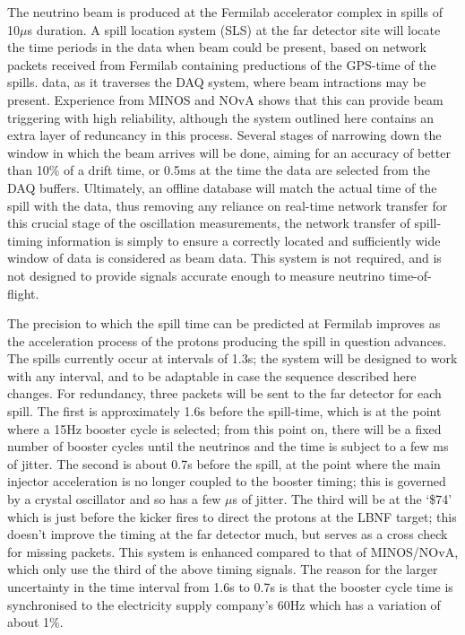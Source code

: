 The neutrino beam is produced at the Fermilab accelerator complex in
spills of 10$\mu$s duration.  A spill location system (SLS) at the far
detector site will locate the time periods in the data when beam could
be present, based on network packets received from Fermilab containing
preductions of the GPS-time of the spills. data, as it traverses the
DAQ system, where beam intractions may be present.  Experience from
MINOS and NOvA shows that this can provide beam triggering with high
reliability, although the system outlined here contains an extra layer
of reduncancy in this process.  Several stages of narrowing down the
window in which the beam arrives will be done, aiming for an accuracy
of better than 10\% of a drift time, or 0.5\/ms at the time the data
are selected from the DAQ buffers.  Ultimately, an offline database
will match the actual time of the spill with the data, thus removing
any reliance on real-time network transfer for this crucial stage of
the oscillation measurements, the network transfer of spill-timing
information is simply to ensure a correctly located and sufficiently
wide window of data is considered as beam data. This system is not
required, and is not designed to provide signals accurate enough to
measure neutrino time-of-flight.

The precision to which the spill time can be predicted at Fermilab
improves as the acceleration process of the protons producing the
spill in question advances.  The spills currently occur at intervals
of 1.3\/s; the system will be designed to work with any interval, and
to be adaptable in case the sequence described here changes.  For
redundancy, three packets will be sent to the far detector for each
spill.  The first is approximately 1.6\/s before the spill-time, which
is at the point where a 15\/Hz booster cycle is selected; from this
point on, there will be a fixed number of booster cycles until the
neutrinos and the time is subject to a few ms of jitter.  The second
is about 0.7\/s before the spill, at the point where the main injector
acceleration is no longer coupled to the booster timing; this is
governed by a crystal oscillator and so has a few $\mu$s of jitter.
The third will be at the `\$74' which is just before the kicker fires
to direct the protons at the LBNF target; this doesn't improve the
timing at the far detector much, but serves as a cross check for
missing packets.  This system is enhanced compared to that of
MINOS/NOvA, which only use the third of the above timing signals.  The
reason for the larger uncertainty in the time interval from 1.6\/s to
0.7\/s is that the booster cycle time is synchronised to the
electricity supply company's 60\/Hz which has a variation of about
1\%.


